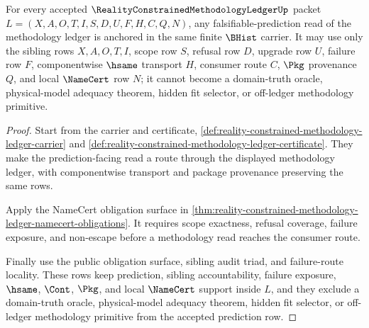\begin{theorem}
\label{thm:reality-constrained-methodology-ledger-prediction-row-nonescape}
For every accepted $\RealityConstrainedMethodologyLedgerUp$ packet
$L=(X,A,O,T,I,S,D,U,F,H,C,Q,N)$, any falsifiable-prediction read of the
methodology ledger is anchored in the same finite $\BHist$ carrier. It may use
only the sibling rows $X,A,O,T,I$, scope row $S$, refusal row $D$, upgrade row
$U$, failure row $F$, componentwise $\hsame$ transport $H$, consumer route $C$,
$\Pkg$ provenance $Q$, and local $\NameCert$ row $N$; it cannot become a
domain-truth oracle, physical-model adequacy theorem, hidden fit selector, or
off-ledger methodology primitive.
\end{theorem}
\begin{proof}
Start from the carrier and certificate,
\autoref{def:reality-constrained-methodology-ledger-carrier} and
\autoref{def:reality-constrained-methodology-ledger-certificate}. They make
the prediction-facing read a route through the displayed methodology ledger,
with componentwise transport and package provenance preserving the same rows.

Apply the NameCert obligation surface in
\autoref{thm:reality-constrained-methodology-ledger-namecert-obligations}. It
requires scope exactness, refusal coverage, failure exposure, and non-escape
before a methodology read reaches the consumer route.

Finally use the public obligation surface, sibling audit triad, and
failure-route locality. These rows keep prediction, sibling accountability,
failure exposure, $\hsame$, $\Cont$, $\Pkg$, and local $\NameCert$ support
inside $L$, and they exclude a domain-truth oracle, physical-model adequacy
theorem, hidden fit selector, or off-ledger methodology primitive from the
accepted prediction row.
\end{proof}

